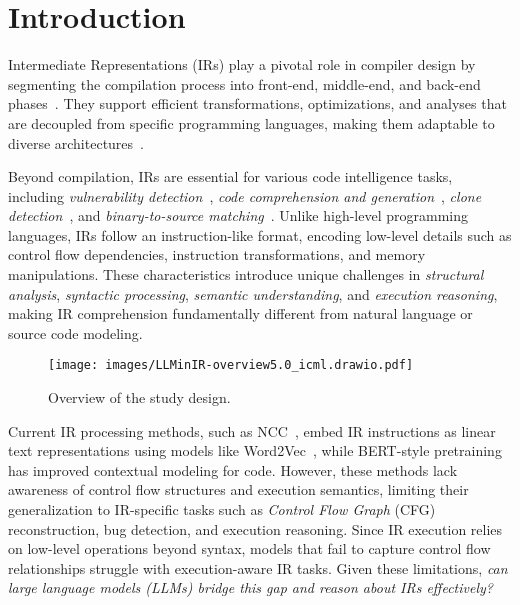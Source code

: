 \section{Introduction}
\label{sec:introduction}

Intermediate Representations (IRs) play a pivotal role in compiler design by segmenting the compilation process into front-end, middle-end, and back-end phases~\cite{reissmann2020rvsdg,webb2021formal,sbirlea2015polyhedral}. They support efficient transformations, optimizations, and analyses that are decoupled from specific programming languages, making them adaptable to diverse architectures~\cite{2013intermediate}. 

Beyond compilation, IRs are essential for various code intelligence tasks, including \textit{vulnerability detection}~\cite{chenguang_zhu__2024,jiang2024happa}, \textit{code comprehension and generation}~\cite{dawei_yuan__2023,jiang2024resilience}, \textit{clone detection}~\cite{indraneil_paul__2024}, and \textit{binary-to-source matching}~\cite{jiawei_mao__2023,josh_collyer__2023}. Unlike high-level programming languages, IRs follow an instruction-like format, encoding low-level details such as control flow dependencies, instruction transformations, and memory manipulations. These characteristics introduce unique challenges in \textit{structural analysis}, \textit{syntactic processing}, \textit{semantic understanding}, and \textit{execution reasoning}, making IR comprehension fundamentally different from natural language or source code modeling.

\begin{figure*}
    \centering
    \texttt{[image: images/LLMinIR-overview5.0\_icml.drawio.pdf]}
    \vspace{-1em}
    \caption{Overview of the study design.}
    \label{fig:overview}
    \vspace{-1em}
\end{figure*}

Current IR processing methods, such as NCC~\cite{2020ir2vec}, embed IR instructions as linear text representations using models like Word2Vec~\cite{church2017word2vec}, while BERT-style pretraining~\cite{2018bert,2020ir2vec,niu2024fair} has improved contextual modeling for code. However, these methods lack awareness of control flow structures and execution semantics, limiting their generalization to IR-specific tasks such as \textit{Control Flow Graph} (CFG) reconstruction, bug detection, and execution reasoning. Since IR execution relies on low-level operations beyond syntax, models that fail to capture control flow relationships struggle with execution-aware IR tasks. 
Given these limitations, \textit{{can large language models (LLMs) bridge this gap and reason about IRs effectively?}}


